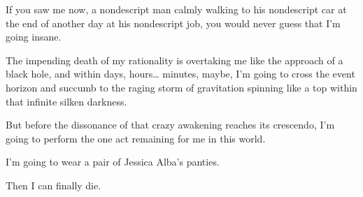 If you saw me now, a nondescript man calmly walking to his
nondescript car at the end of another day at his nondescript job,
you would never guess that I'm going insane.



The impending death of my rationality is overtaking me like the
approach of a black hole, and within days, hours{\ldots} minutes,
maybe, I'm going to cross the event horizon and succumb to
the raging storm of gravitation spinning like a top within that
infinite silken darkness.



But before the dissonance of that crazy awakening rea\-ches its
crescendo, I'm going to perform the one act remaining for me
in this world.



I'm going to wear a pair of Jessica Alba's
panties.



Then I can finally die. 
 


